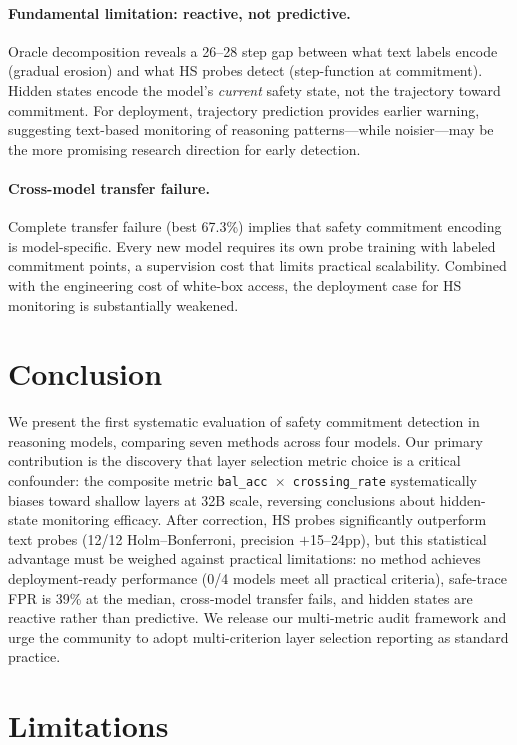 \documentclass[11pt]{article}
\begin{document}
\paragraph{Fundamental limitation: reactive, not predictive.}
Oracle decomposition reveals a 26--28 step gap between what text labels encode (gradual erosion) and what HS probes detect (step-function at commitment). Hidden states encode the model's \emph{current} safety state, not the trajectory toward commitment. For deployment, trajectory prediction provides earlier warning, suggesting text-based monitoring of reasoning patterns---while noisier---may be the more promising research direction for early detection.

\paragraph{Cross-model transfer failure.}
Complete transfer failure (best 67.3\%) implies that safety commitment encoding is model-specific. Every new model requires its own probe training with labeled commitment points, a supervision cost that limits practical scalability. Combined with the engineering cost of white-box access, the deployment case for HS monitoring is substantially weakened.


\section{Conclusion}

We present the first systematic evaluation of safety commitment detection in reasoning models, comparing seven methods across four models. Our primary contribution is the discovery that layer selection metric choice is a critical confounder: the composite metric \texttt{bal\_acc $\times$ crossing\_rate} systematically biases toward shallow layers at 32B scale, reversing conclusions about hidden-state monitoring efficacy. After correction, HS probes significantly outperform text probes (12/12 Holm--Bonferroni, precision $+$15--24pp), but this statistical advantage must be weighed against practical limitations: no method achieves deployment-ready performance (0/4 models meet all practical criteria), safe-trace FPR is 39\% at the median, cross-model transfer fails, and hidden states are reactive rather than predictive. We release our multi-metric audit framework and urge the community to adopt multi-criterion layer selection reporting as standard practice.


\section*{Limitations}
\end{document}

